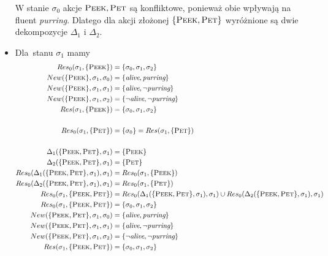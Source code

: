 \documentclass[11pt,a4paper]{article}
\begin{document}
\begin{itemize}
    W stanie $\sigma_0$ akcje $\textsc{Peek}, \textsc{Pet}$ są konfliktowe, ponieważ obie wpływają na fluent \textit{purring}. Dlatego dla akcji złożonej $\{\textsc{Peek}, \textsc{Pet}\}$ wyróżnione są dwie dekompozycje $\Delta_1$ i $\Delta_{2}$.
    
    \item Dla~stanu $\sigma_1$ mamy
    \begin{align*}
        Res_0(\sigma_1, \{ \textsc{Peek} \}) &= \{ \sigma_0, \sigma_1, \sigma_2 \} \\
        New(\{ \textsc{Peek} \}, \sigma_1, \sigma_0) &=  \{ \textit{alive}, \textit{purring} \} \\
        New(\{ \textsc{Peek} \}, \sigma_1, \sigma_1) &=  \{ \textit{alive}, \neg \textit{purring} \} \\
        New(\{ \textsc{Peek} \}, \sigma_1, \sigma_2) &=  \{ \neg \textit{alive}, \neg \textit{purring} \} \\
        Res(\sigma_1, \{ \textsc{Peek} \}) &= \{ \sigma_0, \sigma_1, \sigma_2 \} \\
        \\
        Res_0(\sigma_1, \{ \textsc{Pet} \}) &= \{ \sigma_0 \} = Res(\sigma_1, \{ \textsc{Pet} \}) \\
        \\
        \Delta_1(\{\textsc{Peek},\textsc{Pet}\}, \sigma_1) &= \{\textsc{Peek}\} \\
        \Delta_2(\{\textsc{Peek},\textsc{Pet}\}, \sigma_1) &= \{\textsc{Pet}\} \\
        Res_0(\Delta_1(\{\textsc{Peek},\textsc{Pet}\}, \sigma_1), \sigma_1) &= Res_0(\sigma_1, \{ \textsc{Peek} \}) \\
        Res_0(\Delta_2(\{\textsc{Peek},\textsc{Pet}\}, \sigma_1), \sigma_1) &= Res_0(\sigma_1, \{ \textsc{Pet} \}) \\
        Res_0(\sigma_1, \{\textsc{Peek},\textsc{Pet}\}) &= Res_0(\Delta_1(\{\textsc{Peek},\textsc{Pet}\}, \sigma_1), \sigma_1) \cup Res_0(\Delta_2(\{\textsc{Peek},\textsc{Pet}\}, \sigma_1), \sigma_1) \\
        Res_0(\sigma_1, \{\textsc{Peek},\textsc{Pet}\}) &= \{ \sigma_0, \sigma_1, \sigma_2 \} \\
        New(\{\textsc{Peek},\textsc{Pet}\}, \sigma_1, \sigma_0) &=  \{ \textit{alive}, \textit{purring} \} \\
        New(\{\textsc{Peek},\textsc{Pet}\}, \sigma_1, \sigma_1) &=  \{ \textit{alive}, \neg \textit{purring} \} \\
        New(\{\textsc{Peek},\textsc{Pet}\}, \sigma_1, \sigma_2) &=  \{ \neg \textit{alive}, \neg \textit{purring} \} \\
        Res(\sigma_1, \{\textsc{Peek},\textsc{Pet}\}) &= \{ \sigma_0, \sigma_1, \sigma_2 \}
    \end{align*}
    

\end{itemize}
\end{document}
